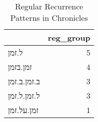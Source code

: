 \begin{table}[htbp!]
\centering
\caption{Regular Recurrence Patterns in Chronicles}
\label{table:regrec_chron}
\begin{tabular}{lr}
\toprule
{} &  reg\_group \\
\midrule
ל.זמן       &          5 \\
זמן.בזמן    &          4 \\
ב.זמן.ב.זמן &          3 \\
ל.זמן.ל.זמן &          3 \\
זמן.על.זמן  &          1 \\
\bottomrule
\end{tabular}
\end{table}
